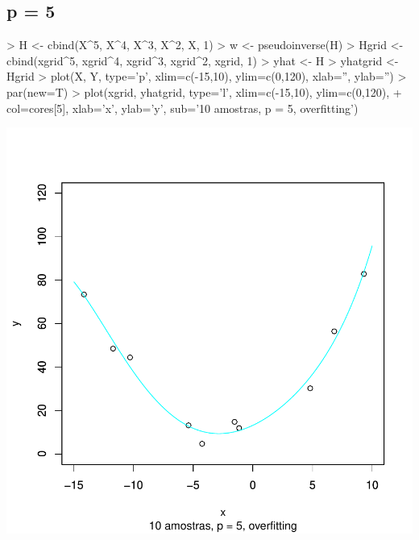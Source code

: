 \documentclass{article}
\begin{document}
\subsection{p = 5}
\begin{Schunk}
\begin{Sinput}
> H <- cbind(X^5, X^4, X^3, X^2, X, 1)
> w <- pseudoinverse(H) %
> Hgrid <- cbind(xgrid^5, xgrid^4, xgrid^3, xgrid^2, xgrid, 1)
> yhat <- H %
> yhatgrid <- Hgrid %
> plot(X, Y, type='p', xlim=c(-15,10), ylim=c(0,120), xlab='', ylab='')
> par(new=T)
> plot(xgrid, yhatgrid, type='l', xlim=c(-15,10), ylim=c(0,120),
+      col=cores[5], xlab='x', ylab='y', sub='10 amostras, p = 5, overfitting')
\end{Sinput}
\end{Schunk}
\includegraphics{aprox-006}
\end{document}
